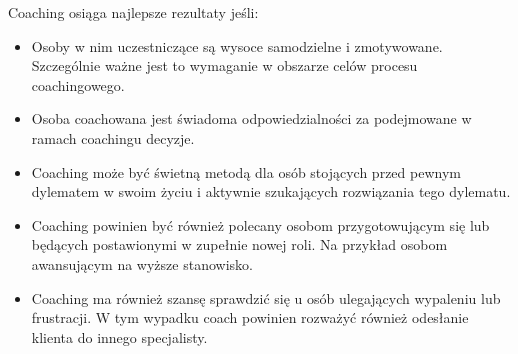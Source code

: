 Coaching osiąga najlepsze rezultaty jeśli:
\begin{itemize}
  \item Osoby w nim uczestniczące są wysoce samodzielne i zmotywowane. Szczególnie ważne jest to wymaganie w obszarze celów procesu coachingowego.
  \item Osoba coachowana jest świadoma odpowiedzialności za podejmowane w ramach coachingu decyzje.
  \item Coaching może być świetną metodą dla osób stojących przed pewnym dylematem w swoim życiu i aktywnie szukających rozwiązania tego dylematu.
  \item Coaching powinien być również polecany osobom przygotowującym się lub będących postawionymi w zupełnie nowej roli.
        Na przykład osobom awansującym na wyższe stanowisko.
  \item Coaching ma również szansę sprawdzić się u osób ulegających wypaleniu lub frustracji. W tym wypadku coach powinien rozważyć również odesłanie
        klienta do innego specjalisty.
\end{itemize}
